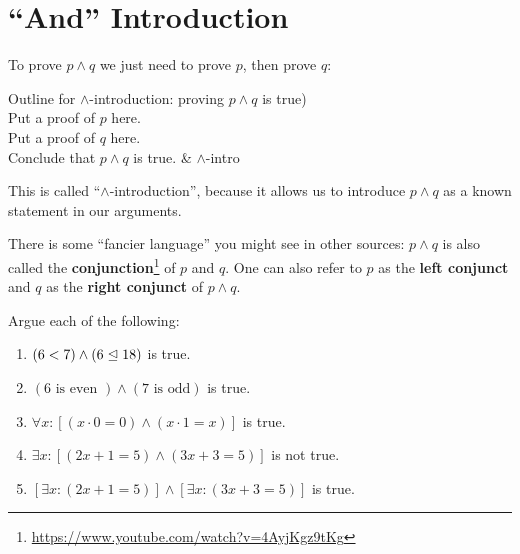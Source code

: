 \section{``And'' Introduction}

To prove $p \wedge q$ we just need to prove $p$, then prove $q$:

\begin{fitch*}
	\textrm{Outline for $\wedge$-introduction:  proving $p \wedge q$ is true)}\\
	\hspace{1 cm}\textrm{Put a proof of $p$ here.}\\
	\hspace{1 cm}\textrm{Put a proof of $q$ here.}\\
	\hspace{1 cm}\textrm{Conclude that $p \wedge q$ is true.} & $\wedge$-intro\\
\end{fitch*}

This is called ``$\wedge$-introduction'', because it allows us to introduce $p \wedge q$ as a known statement in our arguments.

There is some ``fancier language'' you might see in other sources: $p \wedge q$ is also called the  \textbf{conjunction}\footnote{\url{https://www.youtube.com/watch?v=4AyjKgz9tKg}} of $p$ and $q$.  One can also  refer to $p$ as the  \textbf{left conjunct} and $q$ as the \textbf{right conjunct} of $p \wedge q$.

\begin{xca}

	Argue each of the following:
	
	\begin{enumerate}
		\item $(6 < 7 ) \wedge (6\trianglelefteq 18)$ is true.
		\item $(6 \textrm{ is even }) \wedge (7 \textrm{ is odd})$ is true.
		\item $\forall x: [(x \cdot 0 = 0) \wedge (x \cdot 1 = x)]$ is true.
		\item $\exists x: [(2x+1 = 5) \wedge (3x+3 = 5)]$ is not true.
		\item $[\exists x: (2x+1 = 5)] \wedge [\exists x: (3x+3 = 5)]$ is true.
	\end{enumerate}
\end{xca}

